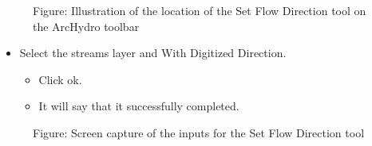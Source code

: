 \documentclass[letterpaper,10pt,english]{sphinxmanual}
\begin{document}
\begin{figure}[htbp]
\centering
\capstart

\noindent{}
\caption{Figure: Illustration of the location of the Set Flow Direction tool on the ArcHydro toolbar}\label{\detokenize{ex_2:id31}}\end{figure}
\begin{itemize}
\item {} 
Select the streams layer and With Digitized Direction.
\begin{itemize}
\item {} 
Click ok.

\item {} 
It will say that it successfully completed.

\end{itemize}

\end{itemize}

\begin{figure}[htbp]
\centering
\capstart

\noindent{}
\caption{Figure: Screen capture of the inputs for the Set Flow Direction tool}\label{\detokenize{ex_2:id32}}\end{figure}
\end{document}
